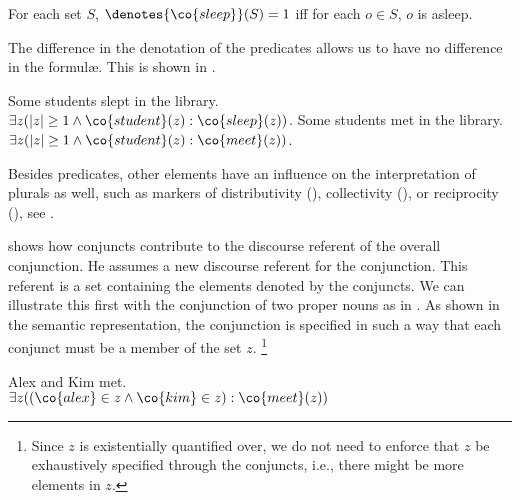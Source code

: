 \documentclass[output=paper]{langsci/langscibook}
\begin{document}
\ea \label{def-sleep-gather}
\begin{xlist}
\ex \label{def-sleep}
For each set $S$, $\denotes{\co{sleep}}(S) = 1$ iff
for each $o \in S$, $o$ is asleep.
\end{xlist}
\z 

The difference in the denotation of the predicates allows us to have no difference in the formulæ. This is shown in .

\ea \label{ex-sleep-gather}
\begin{xlist}
\ex \label{dog-sleep}
Some students slept in the library.\\
$\exists z (|z| \geq 1 \land \co{student}(z) : \co{sleep}(z))$.  
\ex \label{dog-gather}
Some students met in the library.\\
$\exists z (|z| \geq 1 \land \co{student}(z) : \co{meet}(z))$.
\end{xlist}
\z

Besides predicates, other elements have an influence on the interpretation of plurals as well,
such as markers of distributivity (), collectivity (), or reciprocity (), see \citet{Sternefeld:98}.

\citet{Chaves:07} shows how conjuncts contribute to the discourse referent of the overall conjunction. 
He assumes a new discourse referent for the conjunction. This referent is a set containing the elements denoted by the conjuncts.
We can illustrate this first with the conjunction of two proper nouns as in .
As shown in the semantic representation, the conjunction is specified in such a way that each conjunct must be a member of the set $z$.%
\footnote{Since $z$ is existentially quantified over, we do not need to enforce that $z$ be exhaustively specified through the conjuncts, i.e., there might be more elements in $z$.}

\ea \label{AlexKimTalk}
Alex and Kim met.\\
 $\exists z 
((\co{alex} \in z
\land \co{kim} \in z)
: \co{meet}(z))$
\z
\end{document}
